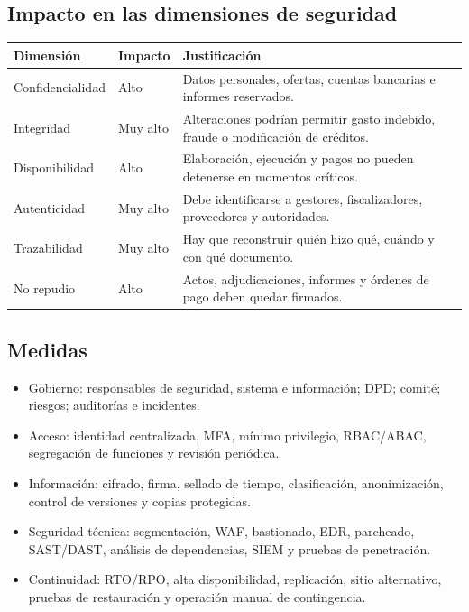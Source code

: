 \documentclass[11pt,a4paper]{article}
\begin{document}
\subsection{Impacto en las dimensiones de seguridad}
\begin{center}
\begin{tabularx}{0.95\textwidth}{l l Y}
\toprule
\textbf{Dimensión} & \textbf{Impacto} & \textbf{Justificación}\\
\midrule
Confidencialidad & Alto & Datos personales, ofertas, cuentas bancarias e informes reservados.\\
Integridad & Muy alto & Alteraciones podrían permitir gasto indebido, fraude o modificación de créditos.\\
Disponibilidad & Alto & Elaboración, ejecución y pagos no pueden detenerse en momentos críticos.\\
Autenticidad & Muy alto & Debe identificarse a gestores, fiscalizadores, proveedores y autoridades.\\
Trazabilidad & Muy alto & Hay que reconstruir quién hizo qué, cuándo y con qué documento.\\
No repudio & Alto & Actos, adjudicaciones, informes y órdenes de pago deben quedar firmados.\\
\bottomrule
\end{tabularx}
\end{center}

\subsection{Medidas}
\begin{itemize}
\item Gobierno: responsables de seguridad, sistema e información; DPD; comité; riesgos; auditorías e incidentes.
\item Acceso: identidad centralizada, MFA, mínimo privilegio, RBAC/ABAC, segregación de funciones y revisión periódica.
\item Información: cifrado, firma, sellado de tiempo, clasificación, anonimización, control de versiones y copias protegidas.
\item Seguridad técnica: segmentación, WAF, bastionado, EDR, parcheado, SAST/DAST, análisis de dependencias, SIEM y pruebas de penetración.
\item Continuidad: RTO/RPO, alta disponibilidad, replicación, sitio alternativo, pruebas de restauración y operación manual de contingencia.
\end{itemize}
\end{document}
